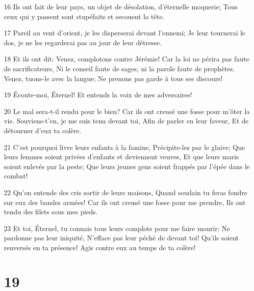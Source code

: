 \par 16 Ils ont fait de leur pays, un objet de désolation, d'éternelle moquerie; Tous ceux qui y passent sont stupéfaits et secouent la tête.
\par 17 Pareil au vent d'orient, je les disperserai devant l'ennemi; Je leur tournerai le dos, je ne les regarderai pas au jour de leur détresse.
\par 18 Et ils ont dit: Venez, complotons contre Jérémie! Car la loi ne périra pas faute de sacrificateurs, Ni le conseil faute de sages, ni la parole faute de prophètes. Venez, tuons-le avec la langue; Ne prenons pas garde à tous ses discours!
\par 19 Écoute-moi, Éternel! Et entends la voix de mes adversaires!
\par 20 Le mal sera-t-il rendu pour le bien? Car ils ont creusé une fosse pour m'ôter la vie. Souviens-t'en, je me suis tenu devant toi, Afin de parler en leur faveur, Et de détourner d'eux ta colère.
\par 21 C'est pourquoi livre leurs enfants à la famine, Précipite-les par le glaive; Que leurs femmes soient privées d'enfants et deviennent veuves, Et que leurs maris soient enlevés par la peste; Que leurs jeunes gens soient frappés par l'épée dans le combat!
\par 22 Qu'on entende des cris sortir de leurs maisons, Quand soudain tu feras fondre sur eux des bandes armées! Car ils ont creusé une fosse pour me prendre, Ils ont tendu des filets sous mes pieds.
\par 23 Et toi, Éternel, tu connais tous leurs complots pour me faire mourir; Ne pardonne pas leur iniquité, N'efface pas leur péché de devant toi! Qu'ils soient renversés en ta présence! Agis contre eux au temps de ta colère!

\chapter{19}

